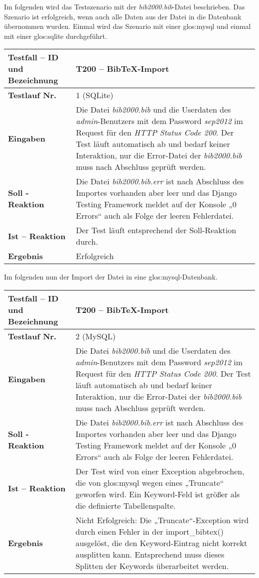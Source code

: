 Im folgenden wird das Testszenario mit der \textit{bib2000.bib}-Datei
beschrieben. Das Szenario ist erfolgreich, wenn auch alle Daten aus der Datei
in die Datenbank übernommen wurden. Einmal wird das Szenario mit einer
\Gls{glos:mysql} und einmal mit einer \Gls{glos:sqlite} durchgeführt.

\begin{longtable}{|p{5cm}|p{10cm}|}
  \hline
  \textbf{Testfall -- ID und Bezeichnung} & T200 -- Bib\TeX -Import \\
  \hline
  \textbf{Testlauf Nr.} & 1 (SQLite) \\
  \hline
  \textbf{Eingaben} &  Die Datei \textit{bib2000.bib} und die Userdaten des
  \textit{admin}-Benutzers mit dem Password \textit{sep2012} im Request für den
  \textit{HTTP Status Code 200}.  Der Test läuft automatisch ab und bedarf keiner
  Interaktion, nur die Error-Datei der \textit{bib2000.bib} muss nach Abschluss
  geprüft werden.\\
  \hline
  \textbf{Soll - Reaktion} & Die Datei \textit{bib2000.bib.err} ist nach
  Abschluss des Importes vorhanden aber leer und das Django Testing Framework
  meldet auf der Konsole „0 Errors“ auch als Folge der leeren Fehlerdatei.
  \\
  \hline
  \textbf{Ist -- Reaktion} & Der Test läuft entsprechend der Soll-Reaktion durch.\\
  \hline
  \textbf{Ergebnis} & Erfolgreich \\
  \hline
\end{longtable}

Im folgenden nun der Import der Datei in eine \Gls{glos:mysql}-Datenbank.
\begin{longtable}{|p{5cm}|p{10cm}|}
  \hline
  \textbf{Testfall -- ID und Bezeichnung} & T200 -- Bib\TeX -Import \\
  \hline
  \textbf{Testlauf Nr.} & 2 (MySQL) \\
  \hline
  \textbf{Eingaben} &  Die Datei \textit{bib2000.bib} und die Userdaten des
  \textit{admin}-Benutzers mit dem Password \textit{sep2012} im Request für den
  \textit{HTTP Status Code 200}.  Der Test läuft automatisch ab und bedarf keiner
  Interaktion, nur die Error-Datei der \textit{bib2000.bib} muss nach Abschluss
  geprüft werden.\\
  \hline
  \textbf{Soll - Reaktion} & Die Datei \textit{bib2000.bib.err} ist nach
  Abschluss des Importes vorhanden aber leer und das Django Testing Framework
  meldet auf der Konsole „0 Errors“ auch als Folge der leeren Fehlerdatei.
  \\
  \hline
  \textbf{Ist -- Reaktion} & Der Test wird von einer Exception abgebrochen, die
  von \Gls{glos:mysql} wegen eines „Truncate“ geworfen wird. Ein Keyword-Feld ist
  größer als die definierte Tabellenspalte.\\
  \hline
  \textbf{Ergebnis} & Nicht Erfolgreich: Die „Truncate“-Exception wird durch
  einen Fehler in der {\sffamily import\_bibtex()} ausgelöst, die den
  Keyword-Eintrag nicht korrekt ausplitten kann. Entsprechend muss dieses
  Splitten der Keywords überarbeitet werden.\\ \hline
\end{longtable}
